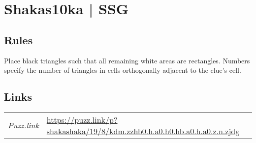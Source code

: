 \section[Shakas10ka | SSG {[\emph{Shakashaka}]}]{Shakas10ka | {\normalfont SSG}}
\label{sec:17-shakas10ka-ssg}

\subsection*{Rules}
\begin{markdown}
Place black triangles such that all remaining white areas are rectangles. Numbers specify the number of triangles in cells orthogonally adjacent to the clue's cell.
\end{markdown}
\subsection*{Links}
\begin{tabularx}{\textwidth}{l X}
\emph{Puzz.link} & \url{https://puzz.link/p?shakashaka/19/8/kdm.zzhb0.h.a0.h0.hb.a0.h.a0.z.n.zjdg} \\
\end{tabularx}
\pagebreak
